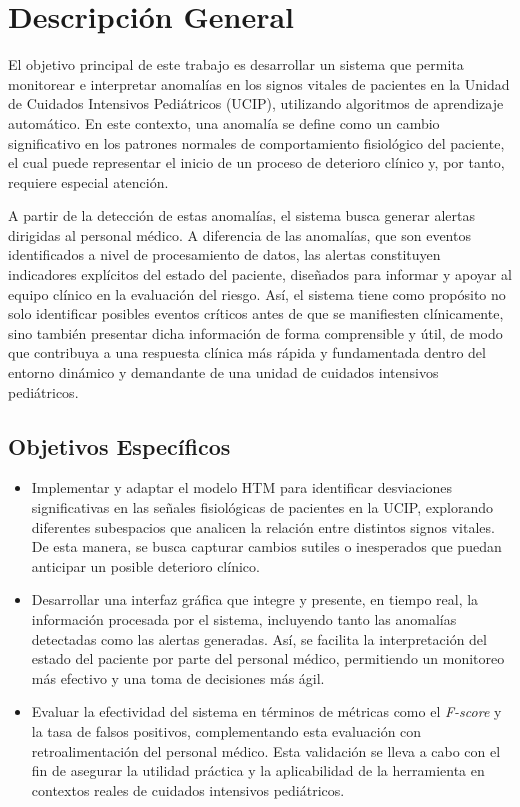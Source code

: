\chapter{Descripción General}

El objetivo principal de este trabajo es desarrollar un sistema que permita monitorear e interpretar anomalías en los signos vitales de pacientes en la Unidad de Cuidados Intensivos Pediátricos (UCIP), utilizando algoritmos de aprendizaje automático. En este contexto, una anomalía se define como un cambio significativo en los patrones normales de comportamiento fisiológico del paciente, el cual puede representar el inicio de un proceso de deterioro clínico y, por tanto, requiere especial atención.

A partir de la detección de estas anomalías, el sistema busca generar alertas dirigidas al personal médico. A diferencia de las anomalías, que son eventos identificados a nivel de procesamiento de datos, las alertas constituyen indicadores explícitos del estado del paciente, diseñados para informar y apoyar al equipo clínico en la evaluación del riesgo. Así, el sistema tiene como propósito no solo identificar posibles eventos críticos antes de que se manifiesten clínicamente, sino también presentar dicha información de forma comprensible y útil, de modo que contribuya a una respuesta clínica más rápida y fundamentada dentro del entorno dinámico y demandante de una unidad de cuidados intensivos pediátricos.

\medskip

\section{Objetivos Específicos}

\begin{itemize}
  \item Implementar y adaptar el modelo HTM para identificar desviaciones significativas en las señales fisiológicas de pacientes en la UCIP, explorando diferentes subespacios que analicen la relación entre distintos signos vitales. De esta manera, se busca capturar cambios sutiles o inesperados que puedan anticipar un posible deterioro clínico.

  \item  Desarrollar una interfaz gráfica que integre y presente, en tiempo real, la información procesada por el sistema, incluyendo tanto las anomalías detectadas como las alertas generadas. Así, se facilita la interpretación del estado del paciente por parte del personal médico, permitiendo un monitoreo más efectivo y una toma de decisiones más ágil.

  \item  Evaluar la efectividad del sistema en términos de métricas como el \textit{F-score} y la tasa de falsos positivos, complementando esta evaluación con retroalimentación del personal médico. Esta validación se lleva a cabo con el fin de asegurar la utilidad práctica y la aplicabilidad de la herramienta en contextos reales de cuidados intensivos pediátricos.

\end{itemize}

